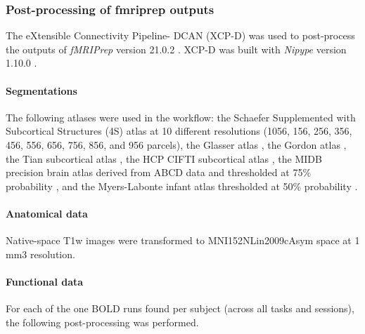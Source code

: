 \documentclass[]{article}
\date{}
\let\oldparagraph\paragraph
\renewcommand{\paragraph}[1]{\oldparagraph{#1}\mbox{}}
\begin{document}
\hypertarget{post-processing-of-fmriprep-outputs}{%
\subsubsection{Post-processing of fmriprep
outputs}\label{post-processing-of-fmriprep-outputs}}

The eXtensible Connectivity Pipeline- DCAN (XCP-D)
\citep{mehta2024xcp, mitigating_2018, satterthwaite_2013} was used to
post-process the outputs of \emph{fMRIPrep} version 21.0.2
\citep[RRID:SCR\_016216]{esteban2019fmriprep, esteban2020analysis}.
XCP-D was built with \emph{Nipype} version 1.10.0
\citep[RRID:SCR\_002502]{nipype1}.

\hypertarget{segmentations}{%
\paragraph{Segmentations}\label{segmentations}}

The following atlases were used in the workflow: the Schaefer
Supplemented with Subcortical Structures (4S) atlas
\citep{Schaefer_2017, pauli2018high, king2019functional, najdenovska2018vivo, glasser2013minimal}
at 10 different resolutions (1056, 156, 256, 356, 456, 556, 656, 756,
856, and 956 parcels), the Glasser atlas \citep{Glasser_2016}, the
Gordon atlas \citep{Gordon_2014}, the Tian subcortical atlas
\citep{tian2020topographic}, the HCP CIFTI subcortical atlas
\citep{glasser2013minimal}, the MIDB precision brain atlas derived from
ABCD data and thresholded at 75\% probability
\citep{hermosillo2024precision}, and the Myers-Labonte infant atlas
thresholded at 50\% probability \citep{myers2023functional}.

\hypertarget{anatomical-data}{%
\paragraph{Anatomical data}\label{anatomical-data}}

Native-space T1w images were transformed to MNI152NLin2009cAsym space at
1 mm3 resolution.

\hypertarget{functional-data}{%
\paragraph{Functional data}\label{functional-data}}

For each of the one BOLD runs found per subject (across all tasks and
sessions), the following post-processing was performed.
\end{document}
